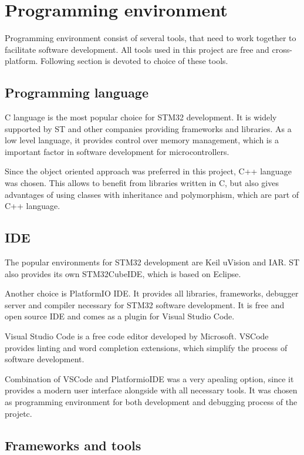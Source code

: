 \documentclass[a4paper,twoside,12pt]{book}
\begin{document}
\section{Programming environment}
Programming environment consist of several tools,
that need to work together to facilitate software development.
All tools used in this project are free and cross-platform.
Following section is devoted to choice of these tools.

\subsection{Programming language}

C language is the most popular choice for STM32 development.
It is widely supported by ST and other companies providing frameworks and libraries.
As a low level language, it provides control over memory management,
which is a important factor in software development for microcontrollers.

Since the object oriented approach was preferred in this project,
C++ language was chosen.
This allows to benefit from libraries written in C,
but also gives advantages of using classes with inheritance and polymorphism,
which are part of C++ language.

\subsection{IDE}

The popular environments for STM32 development are Keil uVision and IAR.
ST also provides its own STM32CubeIDE, which is based on Eclipse.

Another choice is PlatformIO IDE.
It provides all libraries, frameworks,
debugger server and compiler necessary for STM32 software development.
It is free and open source IDE and
comes as a plugin for Visual Studio Code.

Visual Studio Code is a free code editor developed by Microsoft.
VSCode provides linting and word completion extensions,
which simplify the process of software development.

Combination of VSCode and PlatformioIDE was a very apealing option,
since it provides a modern user interface alongside with all necessary tools.
It was chosen as programming environment for both development and debugging
process of the projetc.

\subsection{Frameworks and tools}
\end{document}
